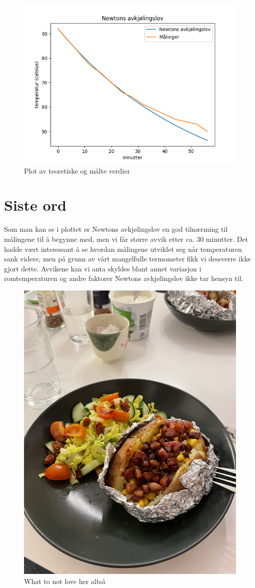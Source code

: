 \documentclass[12pt]{article}
\begin{document}
 \begin{figure} 
     \centering
     \includegraphics[width=0.75\linewidth]{tma4101 oblig kurver.png}
     \caption{Plot av teoretiske og målte verdier}
     \label{fig:enter-label}
 \end{figure}

\FloatBarrier
 
\section{Siste ord}
Som man kan se i plottet er Newtons avkjølingslov en god tilnærming til målingene til å begynne med, men vi får  større avvik etter ca. 30 minutter. Det hadde vært interessant å se hvordan målingene utviklet seg når temperaturen sank videre, men på grunn av vårt mangelfulle termometer fikk vi dessverre ikke gjort dette. Avvikene kan vi anta skyldes blant annet variasjon i romtemperaturen og andre faktorer Newtons avkjølingslov ikke tar hensyn til.  



\begin{figure}
    \centering
    \includegraphics[width=0.50\linewidth, angle=-90]{image_67195393.JPG}
    \caption{What to not love her altså}
    \label{fig:enter-label}
\end{figure}
\end{document}
